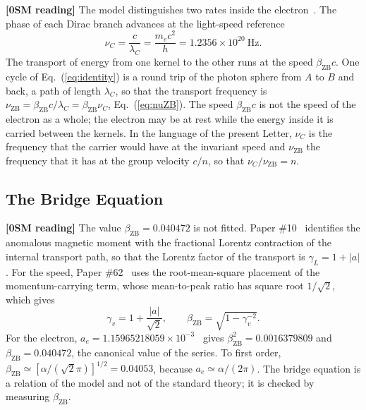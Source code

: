 \documentclass[%
 reprint, amsmath,amssymb, aps, prb, ]{revtex4-2}
\numberwithin{equation}{section}
\begin{document}
\textbf{[0SM reading]} The model distinguishes two rates inside the electron~\cite{H65}. The phase of each Dirac branch advances at the light-speed reference
\begin{equation}
\nu_C = \frac{c}{\lambda_C} = \frac{m_ec^2}{h} = 1.2356\times10^{20}\ \text{Hz}.
\label{eq:nuC}
\end{equation}
The transport of energy from one kernel to the other runs at the speed $\beta_{\text{ZB}}c$. One cycle of Eq.~(\ref{eq:identity}) is a round trip of the photon sphere from $A$ to $B$ and back, a path of length $\lambda_C$, so that the transport frequency is $\nu_{\text{ZB}} = \beta_{\text{ZB}}c/\lambda_C = \beta_{\text{ZB}}\nu_C$, Eq.~(\ref{eq:nuZB}). The speed $\beta_{\text{ZB}}c$ is not the speed of the electron as a whole; the electron may be at rest while the energy inside it is carried between the kernels. In the language of the present Letter, $\nu_C$ is the frequency that the carrier would have at the invariant speed and $\nu_{\text{ZB}}$ the frequency that it has at the group velocity $c/n$, so that $\nu_C/\nu_{\text{ZB}} = n$.

\subsection{The Bridge Equation}
\label{app:bridge}

\textbf{[0SM reading]} The value $\beta_{\text{ZB}} = 0.040472$ is not fitted. Paper \#10~\cite{H10} identifies the anomalous magnetic moment with the fractional Lorentz contraction of the internal transport path, so that the Lorentz factor of the transport is $\gamma_L = 1 + \lvert a\rvert$. For the speed, Paper \#62~\cite{H62} uses the root-mean-square placement of the momentum-carrying term, whose mean-to-peak ratio has square root $1/\sqrt{2}$, which gives
\begin{equation}
\gamma_v = 1 + \frac{\lvert a\rvert}{\sqrt{2}}, \qquad \beta_{\text{ZB}} = \sqrt{1 - \gamma_v^{-2}} .
\label{eq:bridge}
\end{equation}
For the electron, $a_e = 1.15965218059\times10^{-3}$~\cite{Fan2023} gives $\beta_{\text{ZB}}^2 = 0.0016379809$ and $\beta_{\text{ZB}} = 0.040472$, the canonical value of the series. To first order, $\beta_{\text{ZB}} \simeq [\alpha/(\sqrt{2}\pi)]^{1/2} = 0.04053$, because $a_e \simeq \alpha/(2\pi)$. The bridge equation is a relation of the model and not of the standard theory; it is checked by measuring $\beta_{\text{ZB}}$.
\end{document}

